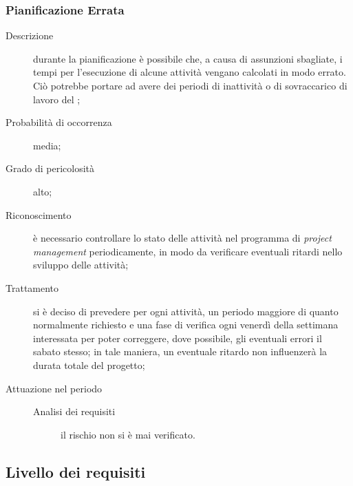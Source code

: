 		\subsubsection{Pianificazione Errata}
		\begin{description}
			\item[Descrizione] durante la pianificazione è possibile che, a causa di assunzioni sbagliate, i tempi per l'esecuzione di alcune attività vengano calcolati in modo errato. Ciò potrebbe portare ad avere dei periodi di inattività o di sovraccarico di lavoro del ;
			\item[Probabilità di occorrenza] media;
			\item[Grado di pericolosità] alto;
			\item[Riconoscimento] è necessario controllare lo stato delle attività nel programma di \emph{project management} periodicamente, in modo da verificare eventuali ritardi nello sviluppo delle attività; 
			\item[Trattamento] si è deciso di prevedere per ogni attività, un periodo maggiore di quanto normalmente richiesto e una fase di verifica ogni venerdì della settimana interessata per poter correggere, dove possibile, gli eventuali errori il sabato stesso; in tale maniera, un eventuale ritardo non influenzerà la durata totale del progetto; 
			\item[Attuazione nel periodo]
			\begin{description}
				\item[Analisi dei requisiti]  il rischio non si è mai verificato.
			\end{description}
		\end{description}
	\subsection{Livello dei requisiti} \label{sec:req}
